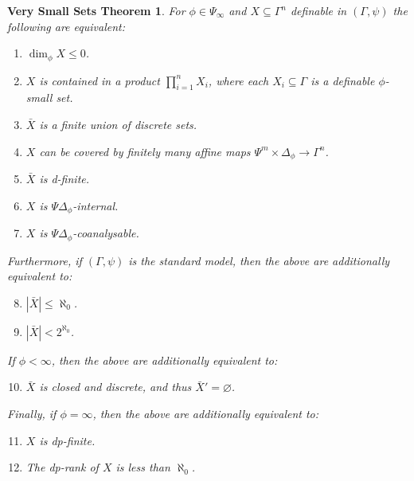 \documentclass[11pt]{amsart}
\theoremstyle{plain}
\newtheorem{verySmallSetsTheorem}[thm]{Very Small Sets Theorem}
\theoremstyle{definition}
\numberwithin{equation}{section}
\newcommand\0{\varnothing}
\begin{document}
\begin{verySmallSetsTheorem}\label{corverysmallsets}
For $\phi\in\Psi_{\infty}$ and $X\subseteq\Gamma^n$ definable in $(\Gamma,\psi)$ the following are equivalent:
\begin{enumerate}
\item\label{vsmallequiv1} $\dim_{\phi} X\leq 0$.
\item\label{vsmallequiv2} $X$ is contained in a product $\prod_{i=1}^n X_i$, where each $X_i\subseteq \Gamma$ is a definable $\phi$-small set.
\item\label{vsmallequiv3} $\bar{X}$ is a finite union of discrete sets.
\item\label{vsmallequiv4} $X$ can be covered by finitely many affine maps $\Psi^{m}\times\Delta_{\phi}\to\Gamma^n$.
\item\label{vsmallequiv5} 
$\bar{X}$ is d-finite.
\item\label{vsmallequiv6} $X$ is $\Psi\Delta_{\phi}$-internal.
\item\label{vsmallequiv7} $X$ is $\Psi\Delta_{\phi}$-coanalysable.
\end{enumerate}
Furthermore, if $(\Gamma,\psi)$ is the standard model, then the above are additionally equivalent to:
\begin{enumerate}
\setcounter{enumi}{7}
\item\label{vsmallequiv8} $|\bar{X}|\leq\aleph_0$.
\item\label{vsmallequiv9} $|\bar{X}|<2^{\aleph_0}$.
\end{enumerate}
If $\phi<\infty$, then the above are additionally equivalent to:
\begin{enumerate}\setcounter{enumi}{9}
\item\label{vsmallequiv10} $\bar{X}$ is closed and discrete, and thus $\bar{X}'=\varnothing$.
\end{enumerate}
Finally, if $\phi=\infty$, then the above are additionally equivalent to:
\begin{enumerate}\setcounter{enumi}{10}
\item\label{vsmallequiv11} $X$ is dp-finite.
\item\label{vsmallequiv12} The dp-rank of $X$ is less than $\aleph_0$.
\end{enumerate}
\end{verySmallSetsTheorem}
\end{document}

